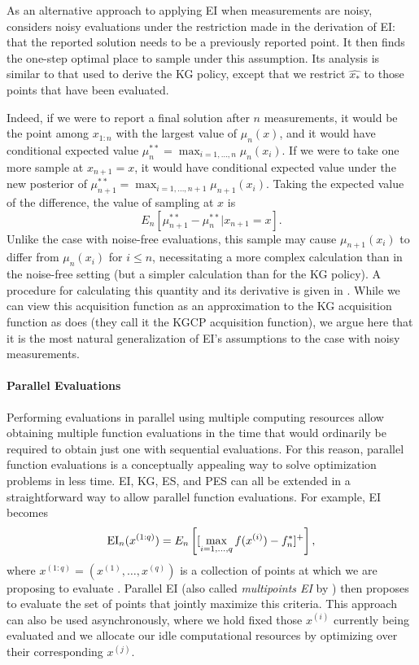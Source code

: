 \documentclass{article}
\begin{document}
As an alternative approach to applying EI when measurements are noisy, \cite{ScottFrazierPowell2011} considers noisy evaluations under the restriction made in the derivation of EI: that the reported solution needs to be a previously reported point.  It then finds the one-step optimal place to sample under this assumption.  Its analysis is similar to that used to derive the KG policy, except that we restrict $\widehat{x_*}$ to those points that have been evaluated. 

Indeed, if we were to report a final solution after $n$ measurements, it would be the point among $x_{1:n}$ with the largest value of $\mu_n(x)$, and it would have conditional expected value 
$\mu^{**}_n = \max_{i=1,\ldots,n} \mu_n(x_i)$.  If we were to take one more sample at $x_{n+1} = x$, it would have conditional expected value under the new posterior of $\mu^{**}_{n+1} = \max_{i=1,\ldots,n+1} \mu_{n+1}(x_i)$.  Taking the expected value of the difference, the value of sampling at $x$ is 
\begin{equation}
E_n\left[ \mu^{**}_{n+1} - \mu^{**}_n | x_{n+1} = x\right].
\label{eq:KGCP}
\end{equation}
Unlike the case with noise-free evaluations, this sample may cause $\mu_{n+1}(x_i)$ to differ from $\mu_n(x_i)$ for $i\le n$, necessitating a more complex calculation than in the noise-free setting (but a simpler calculation than for the KG policy).  A procedure for calculating this quantity and its derivative is given in \cite{ScottFrazierPowell2011}.
While we can view this acquisition function as an approximation to the KG acquisition function as \cite{ScottFrazierPowell2011} does (they call it the KGCP acquisition function), we argue here that it is the most natural generalization of EI's assumptions to the case with noisy measurements.

\paragraph{Parallel Evaluations}
Performing evaluations in parallel using multiple computing resources allow obtaining multiple function evaluations in the time that would ordinarily be required to obtain just one with sequential evaluations.  For this reason, parallel function evaluations is a conceptually appealing way to solve optimization problems in less time.  
EI, KG, ES, and PES can all be extended in a straightforward way to allow parallel function evaluations.  For example, EI becomes 
\begin{equation}
\label{eq:parallel-EI}
\mathrm{EI}_n(x^{(1:q)}) = E_n\left[[\max_{i=1,\ldots,q} f(x^{(i)}) - f^*_n]^+\right],
\end{equation}
where $x^{(1:q)} = (x^{(1)},\ldots, x^{(q)})$ is a collection of points at which we are proposing to evaluate \citep{GiLeCa08}.  Parallel EI (also called {\it multipoints EI} by \cite{GiLeCa08}) then proposes to evaluate the set of points that jointly maximize this criteria.  This approach can also be used asynchronously, where we hold fixed those $x^{(i)}$ currently being evaluated and we allocate our idle computational resources by optimizing over their corresponding $x^{(j)}$.
\end{document}
